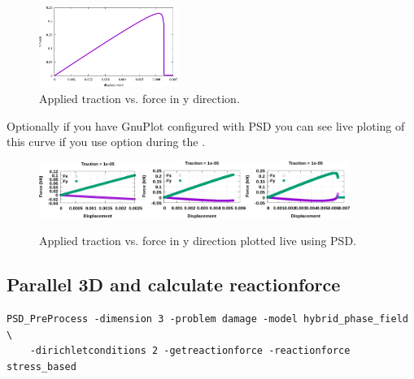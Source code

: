 {{\begin{figure}[h!]
	\includegraphics[width=0.4\textwidth]{./Images/plot-fd.png}
	\caption{Applied traction vs. force in y direction. \label{fd-plot}}
\end{figure}

Optionally if you have GnuPlot configured with PSD you can see live ploting of this curve if you use option   during the  . 

\begin{figure}[h!]
	\centering
	
	\includegraphics[width=0.3\textwidth]{./Images/gp0.png}\includegraphics[width=0.3\textwidth]{./Images/gp1.png}\includegraphics[width=0.3\textwidth]{./Images/gp2.png}
	\caption{Applied traction vs. force in y direction plotted live using PSD. \label{gnuplot-plot}}
\end{figure}



\subsection{Parallel 3D and calculate reactionforce}


\begin{lstlisting}[style=BashInputStyle]
	PSD_PreProcess -dimension 3 -problem damage -model hybrid_phase_field \
	-dirichletconditions 2 -getreactionforce -reactionforce stress_based
\end{lstlisting}

}}
